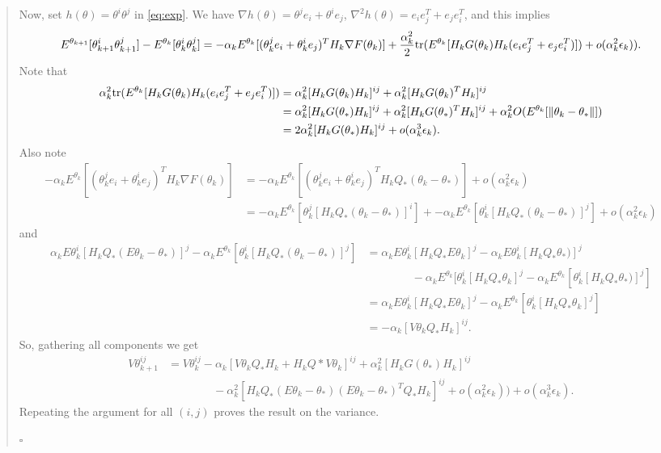 \documentclass[12pt]{article}
\begin{document}
\begin{quote}
Now, set $h(\theta)=\theta^i\theta^j$ in \eqref{eq:exp}. We have $\nabla h(\theta) = \theta^je_i + \theta^ie_j$, $\nabla^2 h(\theta)=e_ie_j^T+e_je_i^T$, and this implies
\[
  E^{\theta_{k+1}}[\theta_{k+1}^i\theta_{k+1}^j] - E^{\theta_k}[\theta_k^i\theta_k^j] = -\alpha_kE^{\theta_k}[(\theta_k^je_i + \theta_k^ie_j)^TH_k\nabla F(\theta_k)]+\dfrac{\alpha_k^2}{2}\mbox{tr}(E^{\theta_k}[H_kG(\theta_k)H_k(e_ie_j^T+e_je_i^T)])
  + o(\alpha_k^2\epsilon_k)). 
\]
Note that 
\begin{align*}
 \alpha_k^2\mbox{tr}(E^{\theta_k}[H_kG(\theta_k)H_k(e_ie_j^T+e_je_i^T)]) &= \alpha_k^2[H_kG(\theta_k)H_k]^{ij}+\alpha_k^2[H_kG(\theta_k)^TH_k]^{ij} \\
 &= \alpha_k^2[H_kG(\theta_\ast)H_k]^{ij}+\alpha_k^2[H_kG(\theta_\ast)^TH_k]^{ij} + \alpha_k^2O(E^{\theta_k}[\|\theta_k-\theta_\ast\|])\\
 &= 2\alpha_k^2[H_kG(\theta_\ast)H_k]^{ij} + o(\alpha_k^3\epsilon_k).
\end{align*}
Also note
\begin{align*}
 -\alpha_kE^{\theta_k}[(\theta_k^je_i + \theta_k^ie_j)^TH_k\nabla F(\theta_k)] &= -\alpha_kE^{\theta_k}[(\theta_k^je_i + \theta_k^ie_j)^TH_kQ_\ast(\theta_k-\theta_\ast)] + o(\alpha_k^2\epsilon_k)\\
 &= -\alpha_kE^{\theta_k}[\theta_k^j[H_kQ_\ast(\theta_k-\theta_\ast)]^i] + -\alpha_kE^{\theta_k}[\theta_k^i[H_kQ_\ast(\theta_k-\theta_\ast)]^j]+ o(\alpha_k^2\epsilon_k)
 \end{align*}
and
\begin{align*}
 \alpha_kE\theta_k^i[H_k Q_\ast (E\theta_k - \theta_\ast)]^j-\alpha_kE^{\theta_k}[\theta_k^i[H_kQ_\ast(\theta_k-\theta_\ast)]^j] 
 &= \alpha_kE\theta_k^i[H_k Q_\ast E\theta_k]^j - \alpha_kE\theta_k^i[H_k Q_\ast\theta_\ast)]^j\\
 &\qquad\qquad-\alpha_kE^{\theta_k}[\theta_k^i[H_kQ_\ast\theta_k]^j-\alpha_kE^{\theta_k}[\theta_k^i[H_kQ_\ast\theta_\ast)]^j]\\ 
 &=\alpha_kE\theta_k^i[H_k Q_\ast E\theta_k]^j -\alpha_kE^{\theta_k}[\theta_k^i[H_kQ_\ast\theta_k]^j]\\
 &=-\alpha_k[V\theta_kQ_\ast H_k]^{ij}.
\end{align*}
So, gathering all components we get
\begin{align*}
 V\theta_{k+1}^{ij} &= V\theta_k^{ij} -\alpha_k[V\theta_kQ_\ast H_k+H_kQ\ast V\theta_k]^{ij} + \alpha_k^2[H_kG(\theta_\ast)H_k]^{ij} \\
 &\qquad\qquad- \alpha_k^2 [H_k Q_\ast (E\theta_k - \theta_\ast)(E\theta_k - \theta_\ast)^TQ_\ast H_k]^{ij} 
 + o(\alpha_k^2\epsilon_k))+ o(\alpha_k^3\epsilon_k).
\end{align*}
Repeating the argument for all $(i,j)$ proves the result on the variance.
\begin{flushright}$\square$\end{flushright}
\end{quote}
\normalsize
\end{document}
